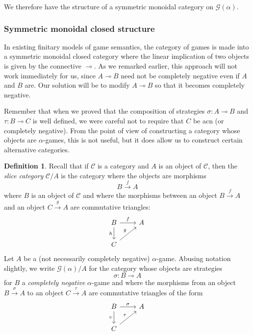 \documentclass[11pt]{article} %
\theoremstyle{plain} %
\theoremstyle{definition} %
\newtheorem{definition}[theorem]{Definition}
\theoremstyle{note}
\theoremstyle{exercisestyle}
\newcommand{\map}[3]{#2\xrightarrow{#1} #3}
\newcommand*\from{\colon}
\renewcommand{\implies}{\multimap}
\newcommand{\G}{\mathcal G}
\newcommand{\C}{{\mathcal{C}}}
\begin{document}
We therefore have the structure of a symmetric monoidal category on $\G(\alpha)$.  

\subsubsection{Symmetric monoidal closed structure}

In existing finitary models of game semantics, the category of games is made into a symmetric monoidal closed category where the linear implication of two objects is given by the connective $\implies$.  As we remarked earlier, this approach will not work immediately for us, since $A\implies B$ need not be completely negative even if $A$ and $B$ are.  Our solution will be to modify $A\implies B$ so that it becomes completely negative.  

Remember that when we proved that the composition of strategies $\sigma\from A\implies B$ and $\tau\from B\implies C$ is well defined, we were careful not to require that $C$ be acn (or completely negative).  From the point of view of constructing a category whose objects are $\alpha$-games, this is not useful, but it does allow us to construct certain alternative categories.

\begin{definition}
  Recall that if $\C$ is a category and $A$ is an object of $\C$, then the \emph{slice category} $\C/A$ is the category where the objects are morphisms
  \[
    \map{f}{B}{A}
    \]
  where $B$ is an object of $\C$ and where the morphisms between an object $\map{f}{B}{A}$ and an object $\map{g}{C}{A}$ are commutative triangles:
  \[
    \begin{tikzcd}
      B \arrow[r, "f"] \arrow[d, "h"']
       & A \\
      C \arrow[ur, "g"]
        &
    \end{tikzcd}
    \]
  Let $A$ be a (not necessarily completely negative) $\alpha$-game.  Abusing notation slightly, we write $\G(\alpha)/A$ for the category whose objects are strategies
  \[
    \sigma\from B\implies A
    \]
  for $B$ a \emph{completely negative} $\alpha$-game and where the morphisms from an object $\map{\sigma}{B}{A}$ to an object $\map{\tau}{C}{A}$ are commutative triangles of the form
  \[
    \begin{tikzcd}
      B \arrow[r, "\sigma"] \arrow[d, "\upsilon"']
       & A \\
      C \arrow[ur, "\tau"]
        &
    \end{tikzcd}
    \]
\end{definition}
\end{document}
